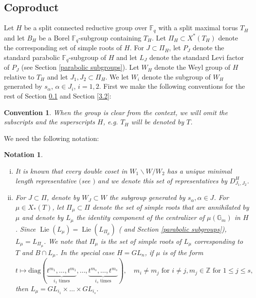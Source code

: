 \documentclass{amsart}
\theoremstyle{plain}
\newtheorem{convention}{Convention}[section]
\newtheorem{notation}{Notation}[section]
\theoremstyle{definition}
\theoremstyle{remark}
\DeclareMathOperator{\lie}{Lie}
\begin{document}
\subsection{Coproduct}\label{coproduct}
Let $H$ be a split connected reductive group over $\mathbb{F}_q$ with a split maximal torus $T_{H}$ and let $B_{H}$ be a Borel $\mathbb{F}_{q}$-subgroup containing $T_H$. Let $\Pi_H\subset X^{*}(T_{H})$ denote the corresponding set of simple roots of $H$. For $J\subset\Pi_H$, let $P_{J}$ denote the standard parabolic $\mathbb{F}_{q}$-subgroup of $H$ and let $L_{J}$ denote the standard Levi factor of $P_J$ (see Section \ref{parabolic subgroups}).
Let $W_H$ denote the Weyl group of $H$ relative to $T_H$ and let $J_{1},J_{2}\subset\Pi_{H}$. We let $W_{i}$ denote the subgroup of $W_{H}$ generated by $s_\alpha$, $\alpha\in J_i$, $i=1,2$. First we make the following conventions for the rest of Section \ref{coproduct} and Section \ref{3.2}:
\begin{convention}
 When the group is clear from the context, we will omit the subscripts and the superscripts $H$, e.g. $T_H$ will be denoted by $T$.   
\end{convention}
We need the following notation:
\begin{notation}
\begin{enumerate}[(i)]
\item
It is known that every double coset in $W_{1}\backslash W/W_{2}$ has a unique minimal length representative $($see \cite[Proposition 2.7.3]{Car}$)$ and we denote this set of representatives by $D^{H}_{J_{1},J_{2}}$. %
\item 
For $J\subset\Pi$, denote by $W_J \subset W$ the subgroup generated by $s_{\alpha}, \alpha \in J$.
For $\mu\in X_{*}(T)$, let $\Pi_{\mu}\subset\Pi$ denote the set of simple roots that are annihilated by $\mu$ and denote by $L_{\mu}$ the identity component of the centralizer of $\mu(\mathbb{G}_{m})$ in $H$. Since $\lie(L_{\mu})=\lie(L_{\Pi_{\mu}})$ (\cite[Theorem 13.33]{Mil1} and Section \ref{parabolic subgroups}), $L_{\mu}=L_{\Pi_{\mu}}$. We note that
 $\Pi_\mu$ is the set of simple roots of $L_{\mu}$ corresponding to $T$ and $B\cap L_{\mu}$. In the special case $H=GL_n$, if $\mu$ is of the form 
\[
t\mapsto\text{diag}(\underbrace{t^{m_1},\ldots,t^{m_1}}_{i_1\text{ times}},\ldots,\underbrace{t^{m_s},\ldots,t^{m_s}}_{i_s\text{ times}}),
\quad m_i\neq m_j \text{ for } i\neq j, m_j\in\mathbb{Z} \text{ for } 1\leq j\leq s,
\]
then $L_\mu=GL_{i_{1}}\times\ldots\times GL_{i_{s}}$.
\end{enumerate}
\end{notation}
\end{document}
